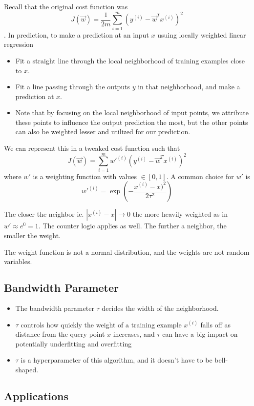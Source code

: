 \documentclass[12pt]{scrartcl}
\begin{document}
Recall that the original cost function was
\[J(\vec{w}) = \frac{1}{2m}\sum_{i = 1}^m (y^{(i)} - \vec{w}^T x^{(i)})^2\]. In prediction, to make a prediction at an input $x$ usuing locally weighted linear regression
\begin{itemize}
    \item Fit a straight line through the local neighborhood of training examples close to $x$.
    \item Fit a line passing through the outputs $y$ in that neighborhood, and make a prediction at $x$.
    \item Note that by focusing on the local neighborhood of input points, we attribute these points to influence the output prediction the most, but the other points can also be weighted lesser and utilized for our prediction.
\end{itemize}
We can represent this in a tweaked cost function such that 
\[J(\vec{w}) = \sum_{i=1}^m w'^{(i)}(y^{(i)} - \vec{w}^Tx^{(i)})^2\]
where $w'$ is a weighting function with values $\in [0, 1]$. A common choice for $w'$ is 
\[w'^{(i)} = \exp(-\frac{x^{(i)} - x)^2}{2\tau^2})\]
\begin{note}
    The closer the neighbor ie. $|x^{(i)} - x| \to 0$ the more heavily weighted as in $w' \approx e^0 = 1$. The counter logic applies as well. The further a neighbor, the smaller the weight.
\end{note}
\begin{note}
    The weight function is not a normal distribution, and the weights are not random variables.
\end{note}

\subsection{Bandwidth Parameter}

\begin{itemize}
    \item The bandwidth parameter $\tau$ decides the width of the neighborhood.
    \item $\tau$ controls how quickly the weight of a training example $x^{(i)}$ falls off as distance from the query point $x$ increases, and $\tau$ can have a big impact on potentially underfitting and overfitting
    \item $\tau$ is a hyperparameter of this algorithm, and it doesn't have to be bell-shaped.
\end{itemize}

\subsection{Applications}
\end{document}
